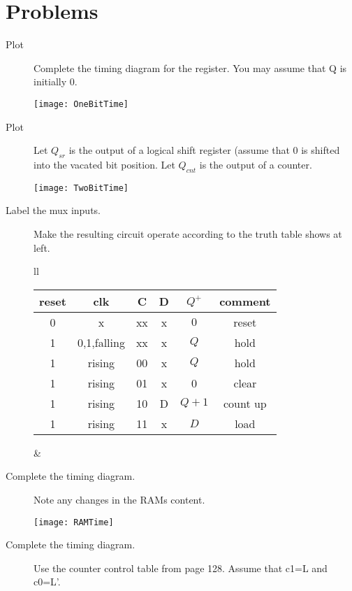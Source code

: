 \section{Problems}
\begin{description}

\item[Plot] Complete the timing diagram for the register.
You may assume that Q is initially 0.

\texttt{[image: OneBitTime]}

\item[Plot] Let 
$Q_{sr}$ is the output of a logical shift register
(assume that 0 is shifted into the vacated bit position.
Let $Q_{cnt}$ is the output of a counter.

\texttt{[image: TwoBitTime]}


\item[Label the mux inputs.]
Make the resulting circuit operate according to the
truth table shows at left.

\begin{tabular}{ll} 
\begin{tabular}{c|c|c|c||c||c}
reset & clk          & C  & D   & $Q^+$  & comment     \\ \hline
0     & x            & xx & x   & $0$    & reset       \\ \hline
1     & 0,1,falling  & xx & x   & $Q$    & hold        \\ \hline
1     & rising       & 00 & x   & $Q$    & hold        \\ \hline
1     & rising       & 01 & x   & 0      & clear       \\ \hline
1     & rising       & 10 & D   & $Q+1$  & count up    \\ \hline
1     & rising       & 11 & x   & $D$    & load        \\ 
\end{tabular}
&
\end{tabular}

\vspace{1cm}

\item[Complete the timing diagram.]  Note any changes in
the RAMs content.

\texttt{[image: RAMTime]}

\pagebreak

\item[Complete the timing diagram.]  Use the counter control table 
from page 128.  Assume that c1=L and c0=L'.


\end{description}
